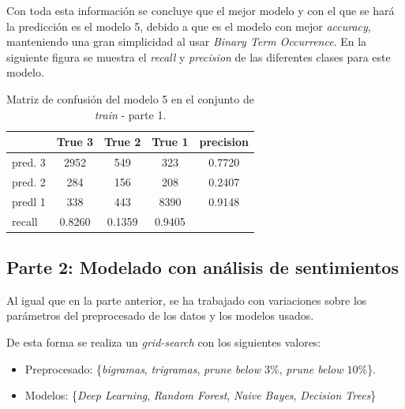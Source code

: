 \documentclass[es]{uc3mreport}
\begin{document}
\begin{report}
    Con toda esta información se concluye que el mejor modelo y con el que se hará
    la predicción es el modelo 5, debido a que es el modelo con mejor
    \textit{accuracy}, manteniendo una gran simplicidad al usar \textit{Binary Term
    Occurrence}. En la siguiente figura se muestra el \textit{recall} y
    \textit{precision} de las diferentes clases para este modelo.

\begin{table}[H]
\center
\begin{tabular}{@{}lccc|c@{}}
    \toprule
             & True 3 & True 2 & True 1 & precision\\
    \hline
    pred. 3  & 2952   & 549    & 323    & 0.7720   \\
    pred. 2  & 284    & 156    & 208    & 0.2407   \\
    predl 1  & 338    & 443    & 8390   & 0.9148   \\
    \hline
    recall   & 0.8260 & 0.1359 & 0.9405 &          \\
    \bottomrule
\end{tabular}
\caption{Matriz de confusión del modelo 5 en el conjunto de \textit{train} -
parte 1.}
\end{table}

\subsection{Parte 2: Modelado con análisis de sentimientos}
\label{sec:parte2}

    Al igual que en la parte anterior, se ha trabajado con variaciones
    sobre los parámetros del preprocesado de los datos y los modelos usados.

    De esta forma se realiza un \textit{grid-search} con los siguientes valores:
    \begin{itemize}
        \item Preprocesado: \{\textit{bigramas}, \textit{trigramas}, \textit{prune below $3\%$}, \textit{prune below $10\%$}\}.
        \item Modelos: \{\textit{Deep Learning}, \textit{Random Forest}, \textit{Naive Bayes}, \textit{Decision Trees}\}
    \end{itemize}


\end{report}
\end{document}
